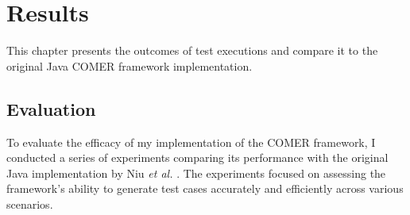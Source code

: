 
\chapter{Results}
\label{ch:results}

This chapter presents the outcomes of test executions and compare it to the original Java COMER framework implementation. 

\section{Evaluation}
\label{sec:evaluation}

To evaluate the efficacy of my implementation of the COMER framework, I conducted a series of experiments comparing its performance with the original Java implementation by Niu \textit{et al.} \cite{comer}.
The experiments focused on assessing the framework's ability to generate test cases accurately and efficiently across various scenarios.